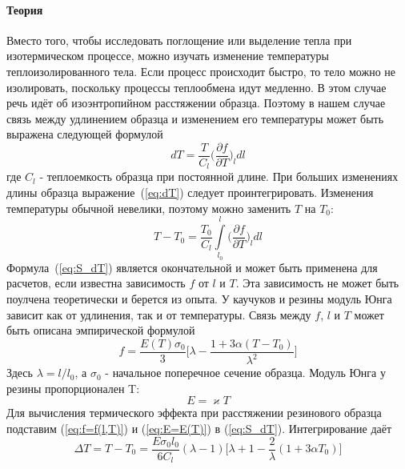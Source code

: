 \documentclass[a4paper,12pt]{article}
\begin{document}
\paragraph{Теория\\}
Вместо того, чтобы исследовать поглощение или выделение тепла при изотермическом процессе, можно изучать изменение температуры теплоизолированного тела. Если процесс происходит быстро, то тело можно не изолировать, поскольку процессы теплообмена идут медленно. В этом случае речь идёт об изоэнтропийном расстяжении образца. Поэтому в нашем случае связь между удлинением образца и изменением его температуры может быть выражена следующей формулой
\begin{equation} \label{eq:dT}
	dT = \frac{T}{C_l}\biggr(\frac{\partial f}{\partial T}\biggl)_l dl
\end{equation}
где $C_l$ - теплоемкость образца при постоянной длине. При больших изменениях длины образца выражение~(\ref{eq:dT}) следует проинтегрировать. Изменения температуры обычной невелики, поэтому можно заменить $T$ на $T_0$:
\begin{equation} \label{eq:S_dT}
    T - T_0 = \frac{T_0}{C_l} \int\limits_{l_0}^l \biggr(\frac{\partial f}{\partial T}\biggl)_l dl
\end{equation}
Формула~(\ref{eq:S_dT}) является окончательной и может быть применена для расчетов, если известна зависимость $f$ от $l$ и $T$. Эта зависимость не может быть поулчена теоретически и берется из опыта.
У каучуков и резины модуль Юнга зависит как от удлинения, так и от температуры. Связь между $f$, $l$ и $T$ может быть описана эмпирической формулой
\begin{equation} \label{eq:f=f(l,T)}				
    f =\frac{E(T)\sigma_0}{3}\biggr[\lambda - \frac{1 + 3\alpha (T - T_0)}{\lambda^2}\biggl]
\end{equation}
Здесь $\lambda = l / l_0$, а $\sigma_0$ - начальное поперечное сечение образца. Модуль Юнга у резины пропорционален T:
\begin{equation} \label{eq:E=E(T)}
    E = \varkappa T
\end{equation}
Для вычисления термического эффекта при расстяжении резинового образца подставим (\ref{eq:f=f(l,T)}) и (\ref{eq:E=E(T)}) в (\ref{eq:S_dT}). Интегрирование даёт
\begin{equation} \label{eq:DT}
    \Delta T = T - T_0 = \frac{E \sigma_0 l_0}{6C_l} (\lambda - 1) \biggr[\lambda + 1 - \frac{2}{\lambda} (1 + 3\alpha T_0) \biggl]
\end{equation}	
\end{document}
